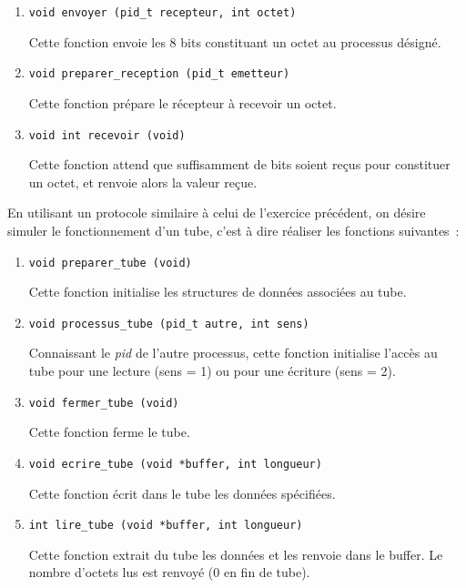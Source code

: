 \begin {enumerate}
    \item \verb:void envoyer (pid_t recepteur, int octet):

	Cette fonction envoie les 8 bits constituant un octet au
	processus désigné.

    \item \verb:void preparer_reception (pid_t emetteur):

	Cette fonction prépare le récepteur à recevoir un octet.

    \item \verb:void int recevoir (void):

	Cette fonction attend que suffisamment de bits soient reçus
	pour constituer un octet,  et renvoie alors la valeur reçue.

\end {enumerate}


\question

En utilisant un protocole similaire à celui de l'exercice précédent,
on désire simuler le fonctionnement d'un tube, c'est à dire réaliser
les fonctions suivantes~:

\begin {enumerate}
    \item \verb:void preparer_tube (void):

	Cette fonction initialise les structures de données associées
	au tube.

    \item \verb:void processus_tube (pid_t autre, int sens):

	Connaissant le \textit {pid} de l'autre processus, cette
	fonction initialise l'accès au tube pour une lecture (sens
	= 1) ou pour une écriture (sens = 2).

    \item \verb:void fermer_tube (void):

	Cette fonction ferme le tube.

    \item \verb:void ecrire_tube (void *buffer, int longueur):

	Cette fonction écrit dans le tube les données spécifiées.

    \item \verb:int lire_tube (void *buffer, int longueur):

	Cette fonction extrait du tube les données et les renvoie
	dans le buffer. Le nombre d'octets lus est renvoyé (0 en
	fin de tube).

\end {enumerate}


